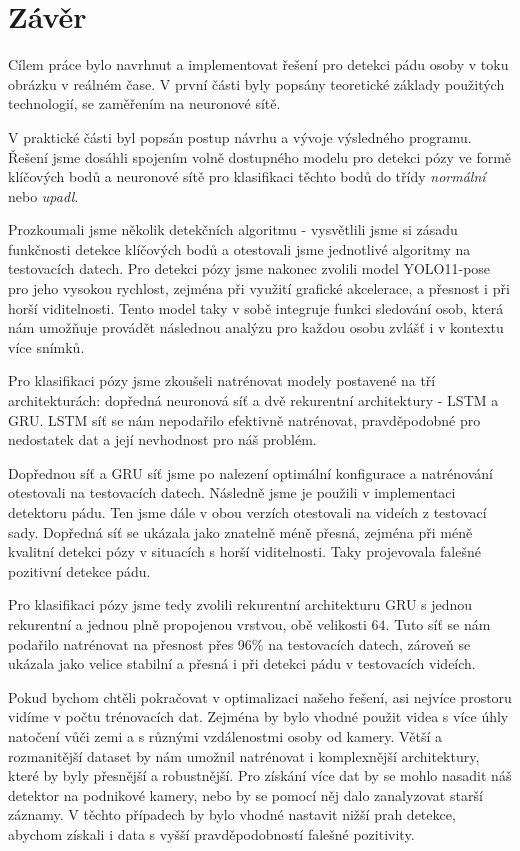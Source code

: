 \chapter{Závěr}
\label{chap:Conclusion}

Cílem práce bylo navrhnut a implementovat řešení pro detekci pádu osoby v toku
obrázku v reálném čase. V první části byly popsány teoretické základy použitých
technologií, se zaměřením na neuronové sítě.

V praktické části byl popsán postup návrhu a vývoje výsledného programu. Řešení
jsme dosáhli spojením volně dostupného modelu pro detekci pózy ve formě
klíčových bodů a neuronové sítě pro klasifikaci těchto bodů do třídy
\textit{normální} nebo \textit{upadl}.

Prozkoumali jsme několik detekčních algoritmu - vysvětlili jsme si zásadu
funkčnosti detekce klíčových bodů a otestovali jsme jednotlivé algoritmy na
testovacích datech. Pro detekci pózy jsme nakonec zvolili model YOLO11-pose pro
jeho vysokou rychlost, zejména při využití grafické akcelerace, a přesnost i
při horší viditelnosti. Tento model taky v sobě integruje funkci sledování
osob, která nám umožňuje provádět následnou analýzu pro každou osobu zvlášť i v
kontextu více snímků.

Pro klasifikaci pózy jsme zkoušeli natrénovat modely postavené na tří
architekturách: dopředná neuronová síť a dvě rekurentní architektury - LSTM a
GRU. LSTM síť se nám nepodařilo efektivně natrénovat, pravděpodobné pro
nedostatek dat a její nevhodnost pro náš problém.

Dopřednou síť a GRU síť jsme po nalezení optimální konfigurace a natrénování
otestovali na testovacích datech. Následně jsme je použili v implementaci
detektoru pádu. Ten jsme dále v obou verzích otestovali na videích z testovací
sady. Dopředná síť se ukázala jako znatelně méně přesná, zejména při méně
kvalitní detekci pózy v situacích s horší viditelnosti. Taky projevovala
falešné pozitivní detekce pádu.

Pro klasifikaci pózy jsme tedy zvolili rekurentní architekturu GRU s jednou
rekurentní a jednou plně propojenou vrstvou, obě velikosti $64$. Tuto síť se
nám podařilo natrénovat na přesnost přes 96\% na testovacích datech, zároveň se
ukázala jako velice stabilní a přesná i při detekci pádu v testovacích videích.

Pokud bychom chtěli pokračovat v optimalizaci našeho řešení, asi nejvíce
prostoru vidíme v počtu trénovacích dat. Zejména by bylo vhodné použit videa s
více úhly natočení vůči zemi a s různými vzdálenostmi osoby od kamery. Větší a
rozmanitější dataset by nám umožnil natrénovat i komplexnější architektury,
které by byly přesnější a robustnější. Pro získání více dat by se mohlo nasadit
náš detektor na podnikové kamery, nebo by se pomocí něj dalo zanalyzovat starší
záznamy. V těchto případech by bylo vhodné nastavit nižší prah detekce, abychom
získali i data s vyšší pravděpodobností falešné pozitivity.

